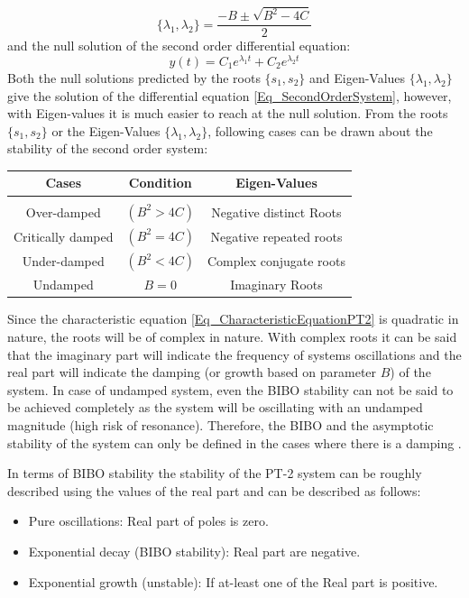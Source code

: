 \begin{equation}
\{\lambda_1,\lambda_2\} = \frac{-B \pm \sqrt{B^2 - 4 C}}{2}
\end{equation}
and the null solution of the second order differential equation:
\begin{equation}
y(t) = C_1 e^{\lambda_{1}t} + C_2 e^{\lambda_{2}t}
\end{equation}
Both the null solutions predicted by the roots $\{s_1,s_2\}$ and Eigen-Values $\{\lambda_1,\lambda_2\}$ give the solution of the differential equation \eqref{Eq_SecondOrderSystem}, however, with Eigen-values it is much easier to reach at the null solution. %
From the roots $\{s_1,s_2\}$ or the Eigen-Values $\{\lambda_1,\lambda_2\}$, following cases can be drawn about the stability of the second order system:

\begin{table}[h!] \centering
	\begin{tabular}{ccc}
		\toprule
		Cases & Condition & Eigen-Values \\ \hline 
		\\
		Over-damped & $(B^2 > 4 C)$ & Negative distinct Roots \\
		Critically damped & $(B^2 = 4 C)$ & Negative repeated roots \\
		Under-damped & $(B^2 < 4 C)$ & Complex conjugate roots \\
		Undamped & $B = 0$ & Imaginary Roots \\
		\bottomrule
	\end{tabular}
	\label{Tab_PT2_Char_Roots}
\end{table}

Since the characteristic equation \eqref{Eq_CharacteristicEquationPT2} is quadratic in nature, the roots will be of complex in nature. With complex roots it can be said that the imaginary part will indicate the frequency of systems oscillations and the real part will indicate the damping (or growth based on parameter $B$) of the system. In case of undamped system, even the BIBO stability can not be said to be achieved completely as the system will be oscillating with an undamped magnitude (high risk of resonance). Therefore, the BIBO and the asymptotic stability of the system can only be defined in the cases where there is a damping \cite{RickHill_11}.

In terms of BIBO stability the stability of the PT-2 system can be roughly described using the values of the real part and can be described as follows:
\begin{itemize}
	\item Pure oscillations: Real part of poles is zero.
	\item Exponential decay (BIBO stability): Real part are negative.
	\item Exponential growth (unstable): If at-least one of the Real part is positive.
\end{itemize}

